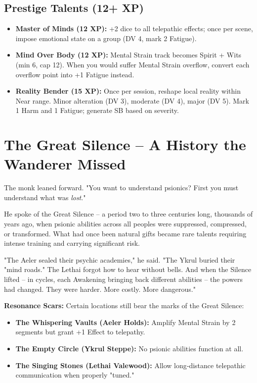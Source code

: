 \documentclass[10pt,a5paper]{book}
\begin{document}
\subsection{Prestige Talents (12+ XP)}
\begin{itemize}
    \item \textbf{Master of Minds (12 XP):} +2 dice to all telepathic effects; once per scene, impose emotional state on a group (DV 4, mark 2 Fatigue).
    \item \textbf{Mind Over Body (12 XP):} Mental Strain track becomes Spirit + Wits (min 6, cap 12). When you would suffer Mental Strain overflow, convert each overflow point into +1 Fatigue instead.
    \item \textbf{Reality Bender (15 XP):} Once per session, reshape local reality within Near range. Minor alteration (DV 3), moderate (DV 4), major (DV 5). Mark 1 Harm and 1 Fatigue; generate SB based on severity.
\end{itemize}

\section{The Great Silence -- A History the Wanderer Missed}

The monk leaned forward. "You want to understand psionics? First you must understand what was \textit{lost}."

He spoke of the Great Silence -- a period two to three centuries long, thousands of years ago, when psionic abilities across all peoples were suppressed, compressed, or transformed. What had once been natural gifts became rare talents requiring intense training and carrying significant risk.

"The Aeler sealed their psychic academies," he said. "The Ykrul buried their "mind roads." The Lethai forgot how to hear without bells. And when the Silence lifted -- in cycles, each Awakening bringing back different abilities -- the powers had changed. They were harder. More costly. More dangerous."

\textbf{Resonance Scars:} Certain locations still bear the marks of the Great Silence:
\begin{itemize}
    \item \textbf{The Whispering Vaults (Aeler Holds):} Amplify Mental Strain by 2 segments but grant +1 Effect to telepathy.
    \item \textbf{The Empty Circle (Ykrul Steppe):} No psionic abilities function at all.
    \item \textbf{The Singing Stones (Lethai Valewood):} Allow long‑distance telepathic communication when properly "tuned."
\end{itemize}
\end{document}
